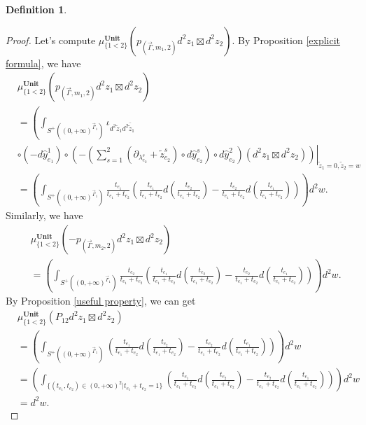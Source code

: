 \documentclass[11pt]{amsart}
\theoremstyle{definition}
\newtheorem{defn}[thm]{Definition}
\theoremstyle{remark}
\numberwithin{equation}{section}
\begin{document}
\begin{defn}
\begin{proof}
        Let's compute $\mu^{\mathbf{Unit}}_{\{1<2\}}(p_{(\vec{\Gamma},m_{1},2)}d^{2}z_{1}\boxtimes d^{2}z_{2})$. By Proposition \ref{explicit formula}, we have
        \begin{align*}
            &\mu^{\mathbf{Unit}}_{\{1<2\}}(p_{(\vec{\Gamma},m_{1},2)}d^{2}z_{1}\boxtimes d^{2}z_{2})\\
            &=\left(\int_{S^{+}((0,+\infty)^{\vec{\Gamma}_{1}})}
        \iota_{d^{2}\tilde{z}_{1}d^{2}\bar{\tilde{z}}_{1}}\right.\\
        &\left.\left.\circ (-d\hat{y}_{e_{1}}^{1})\circ(-(\sum_{s=1}^{2}(\partial_{\lambda_{e_{2}}^{s}}+\tilde{z}_{e_{2}}^{s})\circ d\hat{y}_{e_{2}}^{s})\circ d\hat{y}_{e_{2}}^{2})
        (d^{2}z_{1}\boxtimes d^{2}z_{2})\right)\right|_{\tilde{z}_{1}=0,\tilde{z}_{2}=w}\\
        &=
        \left(\int_{S^{+}((0,+\infty)^{\vec{\Gamma}_{1}})}\frac{t_{e_{1}}}{t_{e_{1}}+t_{e_{2}}}\left(\frac{t_{e_{1}}}{t_{e_{1}}+t_{e_{2}}}d(\frac{t_{e_{2}}}{t_{e_{1}}+t_{e_{2}}})-\frac{t_{e_{2}}}{t_{e_{1}}+t_{e_{2}}}d(\frac{t_{e_{1}}}{t_{e_{1}}+t_{e_{2}}})\right)\right)d^{2}w.
        \end{align*}
        Similarly, we have
        \begin{align*}
            &\mu^{\mathbf{Unit}}_{\{1<2\}}(-p_{(\vec{\Gamma},m_{2},2)}d^{2}z_{1}\boxtimes d^{2}z_{2})\\
            &=
        \left(\int_{S^{+}((0,+\infty)^{\vec{\Gamma}_{1}})}\frac{t_{e_{2}}}{t_{e_{1}}+t_{e_{2}}}\left(\frac{t_{e_{1}}}{t_{e_{1}}+t_{e_{2}}}d(\frac{t_{e_{2}}}{t_{e_{1}}+t_{e_{2}}})-\frac{t_{e_{2}}}{t_{e_{1}}+t_{e_{2}}}d(\frac{t_{e_{1}}}{t_{e_{1}}+t_{e_{2}}})\right)\right)d^{2}w.
        \end{align*}
        By Proposition \ref{useful property}, we can get
        \begin{align*}
            &\mu^{\mathbf{Unit}}_{\{1<2\}}(P_{12}d^{2}z_{1}\boxtimes d^{2}z_{2})\\
            &=
        \left(\int_{S^{+}((0,+\infty)^{\vec{\Gamma}_{1}})}\left(\frac{t_{e_{1}}}{t_{e_{1}}+t_{e_{2}}}d(\frac{t_{e_{2}}}{t_{e_{1}}+t_{e_{2}}})-\frac{t_{e_{2}}}{t_{e_{1}}+t_{e_{2}}}d(\frac{t_{e_{1}}}{t_{e_{1}}+t_{e_{2}}})\right)\right)d^{2}w\\
        &=\left(\int_{\{(t_{e_{1}},t_{e_{2}})\in (0,+\infty)^2|t_{e_{1}}+t_{e_{2}}=1\}}\left(\frac{t_{e_{1}}}{t_{e_{1}}+t_{e_{2}}}d(\frac{t_{e_{2}}}{t_{e_{1}}+t_{e_{2}}})-\frac{t_{e_{2}}}{t_{e_{1}}+t_{e_{2}}}d(\frac{t_{e_{1}}}{t_{e_{1}}+t_{e_{2}}})\right)\right)d^{2}w\\
        &=d^{2}w.
        \end{align*}
    \end{proof}
\end{defn}
\iffalse
\end{document}
